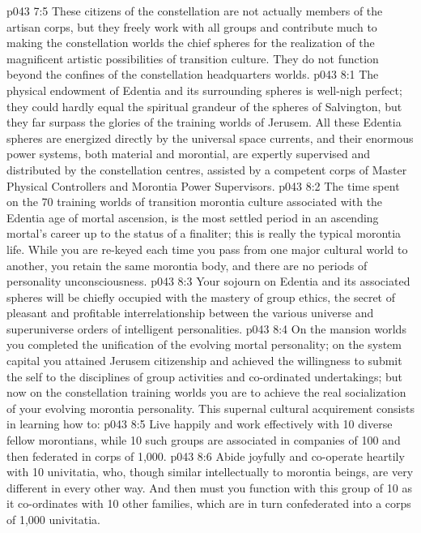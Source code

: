 \vs p043 7:5 These citizens of the constellation are not actually members of the artisan corps, but they freely work with all groups and contribute much to making the constellation worlds the chief spheres for the realization of the magnificent artistic possibilities of transition culture. They do not function beyond the confines of the constellation headquarters worlds.
\vs p043 8:1 The physical endowment of Edentia and its surrounding spheres is well\hyp{}nigh perfect; they could hardly equal the spiritual grandeur of the spheres of Salvington, but they far surpass the glories of the training worlds of Jerusem. All these Edentia spheres are energized directly by the universal space currents, and their enormous power systems, both material and morontial, are expertly supervised and distributed by the constellation centres, assisted by a competent corps of Master Physical Controllers and Morontia Power Supervisors.
\vs p043 8:2 The time spent on the 70 training worlds of transition morontia culture associated with the Edentia age of mortal ascension, is the most settled period in an ascending mortal’s career up to the status of a finaliter; this is really the typical morontia life. While you are re\hyp{}keyed each time you pass from one major cultural world to another, you retain the same morontia body, and there are no periods of personality unconsciousness.
\vs p043 8:3 Your sojourn on Edentia and its associated spheres will be chiefly occupied with the mastery of group ethics, the secret of pleasant and profitable interrelationship between the various universe and superuniverse orders of intelligent personalities.
\vs p043 8:4 On the mansion worlds you completed the unification of the evolving mortal personality; on the system capital you attained Jerusem citizenship and achieved the willingness to submit the self to the disciplines of group activities and co\hyp{}ordinated undertakings; but now on the constellation training worlds you are to achieve the real socialization of your evolving morontia personality. This supernal cultural acquirement consists in learning how to:
\vs p043 8:5 \bibnobreakspace Live happily and work effectively with 10 diverse fellow morontians, while 10 such groups are associated in companies of 100 and then federated in corps of 1,000.
\vs p043 8:6 \bibnobreakspace Abide joyfully and co\hyp{}operate heartily with 10 univitatia, who, though similar intellectually to morontia beings, are very different in every other way. And then must you function with this group of 10 as it co\hyp{}ordinates with 10 other families, which are in turn confederated into a corps of 1,000 univitatia.
